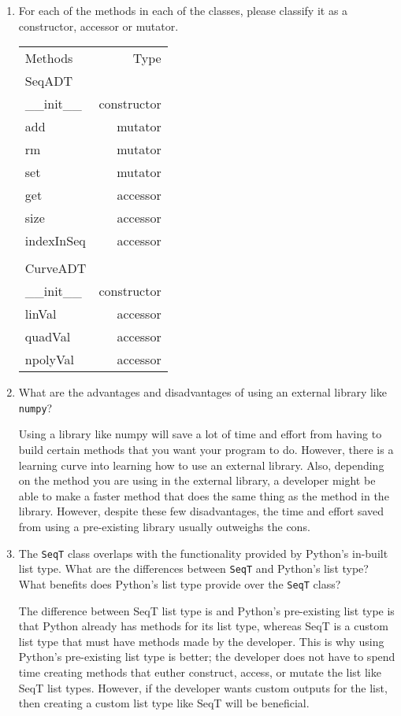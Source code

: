 \documentclass[12pt]{article}
\begin{document}
\begin{enumerate}

\item For each of the methods in each of the classes, please classify it as a
  constructor, accessor or mutator.

\begin{tabular}{lr}
		Methods & Type\\
		SeqADT\\
		\_\_init\_\_ & constructor\\
		add & mutator\\
		rm & mutator\\
		set & mutator\\
		get & accessor\\
		size & accessor\\
		indexInSeq & accessor\\\\
		CurveADT\\
		\_\_init\_\_ & constructor\\
		linVal & accessor\\
		quadVal & accessor\\
		npolyVal & accessor
\end{tabular}
\newpage
\item What are the advantages and disadvantages of using an external library
  like \texttt{numpy}?

Using a library like numpy will save a lot of time and effort from having to build certain methods that you want your program to do. However, there is a learning curve into learning how to use an external library. Also, depending on the method you are using in the external library, a developer might be able to make a faster method that does the same thing as the method in the library. However, despite these few disadvantages, the time and effort saved from using a pre-existing library usually outweighs the cons.

\item The \texttt{SeqT} class overlaps with the functionality provided by
  Python's in-built list type.  What are the differences between \texttt{SeqT}
  and Python's list type?  What benefits does Python's list type provide over
  the \texttt{SeqT} class?

The difference between SeqT list type is and Python's pre-existing list type is that Python already has methods for its list type, whereas SeqT is a custom list type that must have methods made by the developer. This is why using Python's pre-existing list type is better; the developer does not have to spend time creating methods that euther construct, access, or mutate the list like SeqT list types. However, if the developer wants custom outputs for the list, then creating a custom list type like SeqT will be beneficial.


\end{enumerate}
\end{document}
